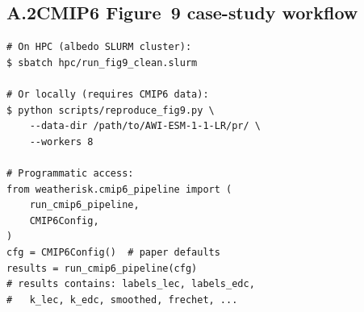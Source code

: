 \documentclass[preprint,12pt,a4paper]{elsarticle}
\newcommand{\rev}[1]{{#1}}
\newcommand{\revb}[1]{{\color{RevisionBlue}#1}}
\begin{document}
\rev{\subsection{A.2\quad CMIP6 Figure~9 \revb{case-study workflow}}}

\begin{lstlisting}[caption={\revb{Running the Figure~9 case study} on HPC or
  locally.}, label=lst:app-fig9]
# On HPC (albedo SLURM cluster):
$ sbatch hpc/run_fig9_clean.slurm

# Or locally (requires CMIP6 data):
$ python scripts/reproduce_fig9.py \
    --data-dir /path/to/AWI-ESM-1-1-LR/pr/ \
    --workers 8

# Programmatic access:
from weatherisk.cmip6_pipeline import (
    run_cmip6_pipeline,
    CMIP6Config,
)
cfg = CMIP6Config()  # paper defaults
results = run_cmip6_pipeline(cfg)
# results contains: labels_lec, labels_edc,
#   k_lec, k_edc, smoothed, frechet, ...
\end{lstlisting}
\end{document}
